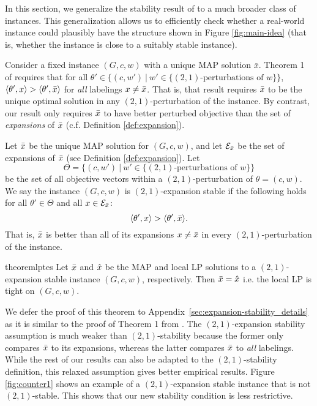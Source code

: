 In this section, we generalize the stability result of \citet{LanSonVij18} to a much broader class of instances.
This generalization allows us to efficiently check whether a real-world instance could plausibly have the structure shown in Figure \ref{fig:main-idea} (that is, whether the instance is close to a suitably stable instance).

Consider a fixed instance $(G,c,w)$ with a unique MAP solution $\bar{x}$.
Theorem 1 of \citet{LanSonVij18} requires that for all $\theta' \in \{(c,w')\ |\ w' \in \{(2,1)\text{-perturbations of } w\}\}$, $\langle \theta', x \rangle > \langle \theta', \bar{x} \rangle$ for \emph{all} labelings $x\ne \bar{x}$.
That is, that result requires $\bar{x}$ to be the unique optimal solution in any $(2,1)$-perturbation of the instance.
By contrast, our result only requires $\bar{x}$ to have better perturbed objective than the set of \emph{expansions} of $\bar{x}$ (c.f. Definition \ref{def:expansion}).
\begin{definition}
\label{def:expansion-stability}
    Let $\bar{x}$ be the unique MAP solution for $(G,c,w)$, and let $\mathcal{E}_{\bar{x}}$ be the set of expansions of $\bar{x}$ (see Definition \ref{def:expansion}). 
    Let \[
    \Theta = \{(c,w')\ |\  w' \in \{(2,1)\text{-perturbations of } w\}\}
    \]
    be the set of all objective vectors within a $(2,1)$-perturbation of $\theta = (c,w)$. We say the instance $(G,c,w)$ is $(2,1)$-expansion stable if the following holds for all $\theta' \in \Theta$ and all $x\in \mathcal{E}_{\bar{x}}$:
    \[
        \langle \theta',x\rangle > \langle \theta',\bar{x}\rangle.
    \]
    That is, $\bar{x}$ is better than all of its expansions $x \ne \bar{x}$ in every $(2,1)$-perturbation of the instance.
\end{definition}

\begin{restatable}{theorem}{lptes}\label{thm:lptes}
Let $\bar{x}$ and $\hat{x}$ be the MAP and local LP solutions to a $(2,1)$-expansion stable instance $(G,c,w)$, respectively. Then $\bar{x} = \hat{x}$ i.e. the local LP is tight on $(G,c,w)$.
\end{restatable}
We defer the proof of this theorem to Appendix~\ref{sec:expansion-stability_details} as it is similar to the proof of Theorem 1 from \citet{LanSonVij18}. 
The $(2,1)$-expansion stability assumption is much weaker than $(2,1)$-stability because the former only compares $\bar{x}$ to its expansions, whereas the latter compares $\bar{x}$ to \emph{all} labelings.
While the rest of our results can also be adapted to the $(2,1)$-stability definition, this relaxed assumption gives better empirical results. Figure \ref{fig:counter1} shows an example of a $(2,1)$-expansion stable instance that is not $(2,1)$-stable. This shows that our new stability condition is less restrictive.
